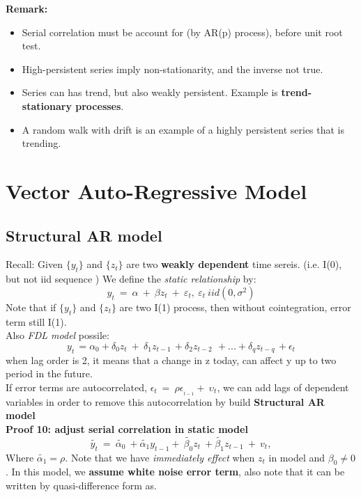 \documentclass[12pt]{article}
\begin{document}
\noindent
{\color{ForestGreen}\textbf{Remark: }} 
\begin{itemize}
\item
Serial correlation must be account for (by AR(p) process), before unit root test.
\item
High-persistent series imply non-stationarity, and the inverse not true.
\item
Series can has trend, but also weakly persistent. Example is \textbf{trend-stationary processes}. 
\item
A random walk with drift is an example of a highly persistent series that is trending.
\end{itemize}


\newpage
{\color{RoyalBlue}
\section{Vector Auto-Regressive Model}}
{\color{RoyalBlue}
\subsection{Structural AR model}}
Recall:
Given $\{y_t\}$ and $\{z_t\}$ are two \textbf{weakly dependent} time sereis. (i.e. I(0), but not iid sequence )
We define the \textit{static relationship} by: 
$$y_t\ =\ \alpha\ +\ \beta z_t\ +\ \varepsilon_t,\  \varepsilon_t\  iid (0, \sigma^2)$$
Note that if $\{y_t\}$ and $\{z_t\}$ are two I(1) process, then without cointegration, error term still I(1).\\

Also \textit{FDL model} possile:
$$ y_{t\ }=\alpha_0+\delta_0z_t\ +\ \delta_1z_{t-1\ }+\delta_2z_{t-2\ }\ +...+\delta_qz_{t-q\ }+\epsilon_t $$
when lag order is 2, it means that a change in z today, can affect y up to two period in the future. 
\\

\noindent
If error terms are autocorrelated,  $\epsilon_t\ =\ \rho\epsilon_{_{t-1}}+\ \upsilon_t $, we can add lags of dependent variables in order to remove this autocorrelation by build \textbf{Structural AR model}
\\
\noindent
{\color{Tan} \textbf{Proof 10: adjust serial correlation in static model}}
\begin{equation}
\tilde{y_t}\ =\ \tilde{\alpha _0}\ + \tilde{\alpha _1}y_{t-1}+\ \tilde{\beta _0}z_t\ + \tilde{\beta _1}z_{t-1}\ +\ v_t,
\end{equation}
Where $\tilde{\alpha_1} = \rho$. 
Note that we have \textit{immediately effect} when $z_t$ in model and $\beta_0 \ne 0$. In this model, we \textbf{assume white noise error term}, also note that it can be written by quasi-difference form as. 
\\
\end{document}
